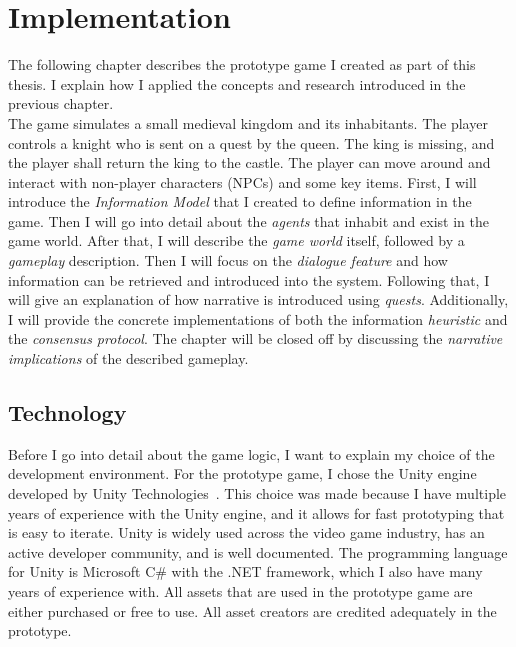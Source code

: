\chapter{Implementation}
The following chapter describes the prototype game I created as part of this thesis. I explain how I applied the concepts and research introduced in the previous chapter.\\
The game simulates a small medieval kingdom and its inhabitants. The player controls a knight who is sent on a quest by the queen. The king is missing, and the player shall return the king to the castle. The player can move around and interact with non-player characters (NPCs) and some key items. First, I will introduce the \textit{Information Model} that I created to define information in the game. Then I will go into detail about the \textit{agents} that inhabit and exist in the game world. After that, I will describe the \textit{game world} itself, followed by a \textit{gameplay} description. Then I will focus on the \textit{dialogue feature} and how information can be retrieved and introduced into the system. Following that, I will give an explanation of how narrative is introduced using \textit{quests}. Additionally, I will provide the concrete implementations of both the information \textit{heuristic} and the \textit{consensus protocol}. The chapter will be closed off by discussing the \textit{narrative implications} of the described gameplay.
\section{Technology}
Before I go into detail about the game logic, I want to explain my choice of the development environment. For the prototype game, I chose the Unity engine developed by Unity Technologies~\cite{Unity2021}. This choice was made because I have multiple years of experience with the Unity engine, and it allows for fast prototyping that is easy to iterate. Unity is widely used across the video game industry, has an active developer community, and is well documented. The programming language for Unity is Microsoft C\# with the .NET framework, which I also have many years of experience with. All assets that are used in the prototype game are either purchased or free to use. All asset creators are credited adequately in the prototype.
